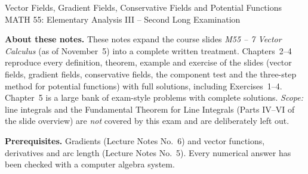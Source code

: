 \documentclass[11pt,a4paper]{article}
\begin{document}

  {Vector Fields, Gradient Fields, Conservative Fields and Potential Functions}
  {MATH 55: Elementary Analysis III -- Second Long Examination}
  {\textbf{About these notes.} These notes expand the course slides
   \emph{M55 -- 7 Vector Calculus} (as of November~5) into a complete written
   treatment. Chapters~2--4 reproduce every definition, theorem, example and
   exercise of the slides (vector fields, gradient fields, conservative
   fields, the component test and the three-step method for potential
   functions) with full solutions, including Exercises~1--4.
   Chapter~5 is a large bank of exam-style problems with complete solutions.
   \emph{Scope:} line integrals and the Fundamental Theorem for Line
   Integrals (Parts IV--VI of the slide overview) are \emph{not} covered by
   this exam and are deliberately left out.\par\medskip
   \textbf{Prerequisites.} Gradients (Lecture Notes No.~6) and vector
   functions, derivatives and arc length (Lecture Notes No.~5). Every
   numerical answer has been checked with a computer algebra system.}

\tableofcontents
\clearpage
{}







\startappendix

\end{document}
